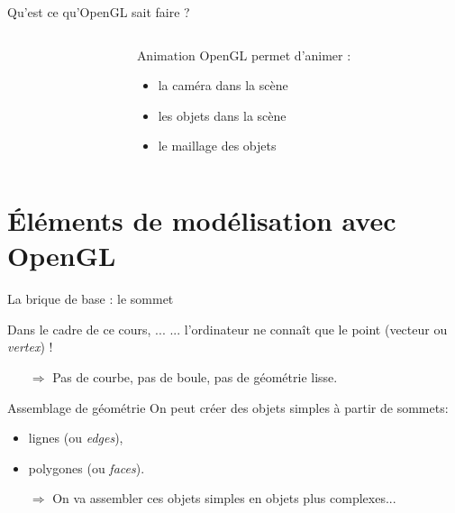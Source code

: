 \documentclass{beamer}
\begin{document}
\begin{frame}{Qu'est ce qu'OpenGL sait faire ?}
\begin{columns}
\begin{column}{0.4\textwidth}
		\end{column}
		\begin{column}{0.55\textwidth}
			\begin{block}{Animation}
				OpenGL permet d'animer :
				\begin{itemize}
					\item la caméra dans la scène
					\item les objets dans la scène
					\item le maillage des objets
				\end{itemize}
			\end{block}
		\end{column}
	\end{columns}
\end{frame}



\section{\'El\'ements de modélisation avec OpenGL}

\begin{frame}{La brique de base : le sommet}
	\begin{alertblock}{Dans le cadre de ce cours, ...}
		... l'ordinateur ne conna\^it que le point (vecteur ou \emph{vertex}) !
	\end{alertblock}
	\begin{itemize}
		\item[$\Rightarrow$] Pas de courbe, pas de boule, pas de géométrie lisse.
	\end{itemize}
	\pause
	\begin{block}{Assemblage de géométrie}
		On peut créer des objets simples à partir de sommets:
		\begin{itemize}
			\item lignes (ou \emph{edges}),
			\item polygones (ou \emph{faces}).
		\end{itemize}
	\end{block}
	\begin{itemize}
		\item[$\Rightarrow$] On va assembler ces objets simples en objets plus complexes...
	\end{itemize}
\end{frame}
\end{document}
